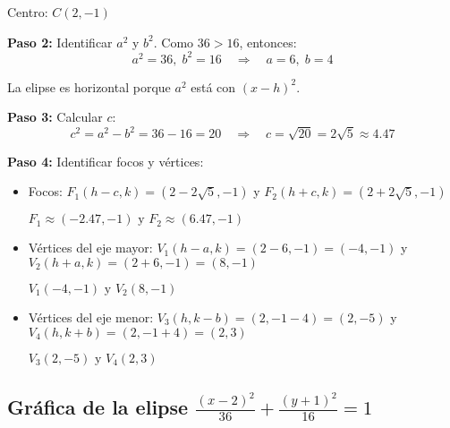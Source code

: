 \documentclass[12pt,a4paper]{article}
\begin{document}
	Centro: $\boxed{C(2,-1)}$

	\textbf{Paso 2:} Identificar $a^2$ y $b^2$. Como $36>16$, entonces:
	\[
	a^2=36,\;b^2=16 \quad\Rightarrow\quad a=6,\;b=4
	\]

	La elipse es horizontal porque $a^2$ está con $(x-h)^2$.

	\textbf{Paso 3:} Calcular $c$:
	\[
	c^2=a^2-b^2=36-16=20 \quad\Rightarrow\quad c=\sqrt{20}=2\sqrt{5}\approx 4.47
	\]

	\textbf{Paso 4:} Identificar focos y vértices:
	\begin{itemize}
		\item Focos: $F_1(h-c,k)=(2-2\sqrt{5},-1)$ y $F_2(h+c,k)=(2+2\sqrt{5},-1)$

		$\boxed{F_1\approx(-2.47,-1)\text{ y }F_2\approx(6.47,-1)}$

		\item Vértices del eje mayor: $V_1(h-a,k)=(2-6,-1)=(-4,-1)$ y $V_2(h+a,k)=(2+6,-1)=(8,-1)$

		$\boxed{V_1(-4,-1)\text{ y }V_2(8,-1)}$

		\item Vértices del eje menor: $V_3(h,k-b)=(2,-1-4)=(2,-5)$ y $V_4(h,k+b)=(2,-1+4)=(2,3)$

		$\boxed{V_3(2,-5)\text{ y }V_4(2,3)}$
	\end{itemize}

	\subsection*{Gráfica de la elipse $\displaystyle\frac{(x-2)^2}{36}+\frac{(y+1)^2}{16}=1$}
\end{document}
